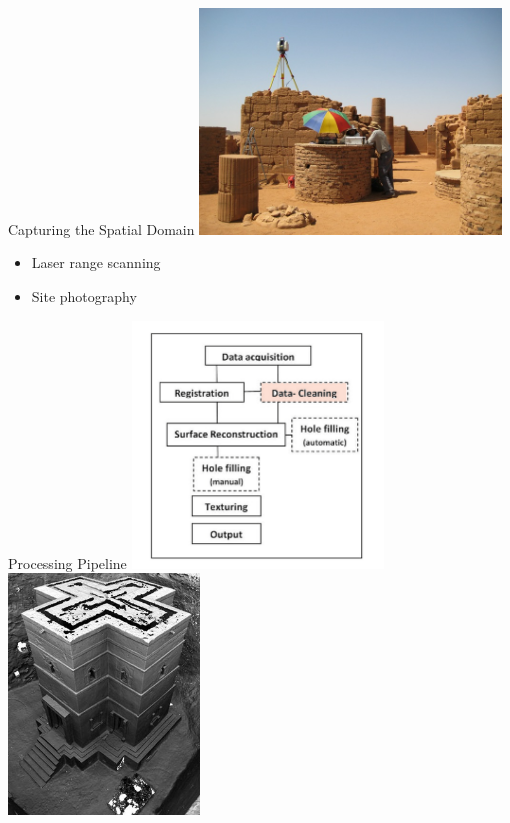 \documentclass{beamer}
\begin{document}
\begin{frame}{Capturing the Spatial Domain}
  \includegraphics[width=0.60\textwidth]{pics/scanning.jpg}
    \begin{itemize}
  \item
    Laser range scanning
  \item
    Site photography
  \end{itemize}
\end{frame}

\begin{frame}{Processing Pipeline}
  \includegraphics[width=0.50\textwidth]{pics/pipeline.png}
  \includegraphics[width=0.38\textwidth]{pics/zamani2.jpg}
\end{frame}
\end{document}
